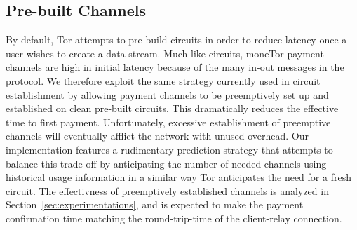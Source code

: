 
%
%

\subsection{Pre-built Channels}
By default, Tor attempts to pre-build circuits in order to reduce latency once a
user wishes to create a data stream. Much like circuits, moneTor payment
channels are high in initial latency because of the many in-out messages in the
protocol. We therefore exploit the same strategy currently used in circuit
establishment by allowing payment channels to be preemptively set up and
established on clean pre-built circuits. This dramatically reduces the effective
time to first payment. Unfortunately, excessive establishment of preemptive
channels will eventually afflict the network with unused overhead. Our
implementation features a rudimentary prediction strategy that attempts to
balance this trade-off by anticipating the number of needed channels using
historical usage information in a similar way Tor anticipates the need for a
fresh circuit. The effectivness of preemptively established channels is analyzed
in Section~\ref{sec:experimentations}, and is expected to make the payment
confirmation time matching the round-trip-time of the client-relay connection.

